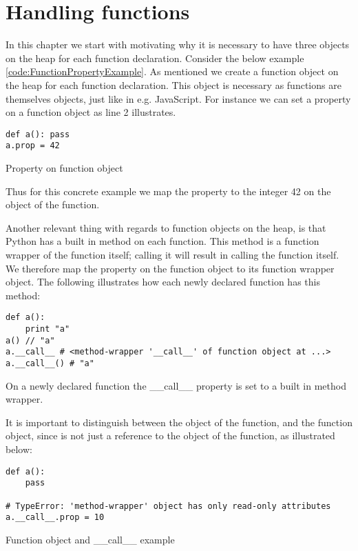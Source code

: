 \chapter{Handling functions}
\label{Functions}
In this chapter we start with motivating why it is necessary to have three objects on the heap for each function declaration. Consider the below example \ref{code:FunctionPropertyExample}. As mentioned we create a function object on the heap for each function declaration. This object is necessary as functions are themselves objects, just like in e.g. JavaScript. For instance we can set a property on a function object as line 2 illustrates.

\begin{listing}[H]
	\begin{verbatim}
def a(): pass
a.prop = 42
	\end{verbatim}
\caption{Property on function object}\label{code:FunctionPropertyExample}
\end{listing}

Thus for this concrete example we map the property  to the integer 42 on the object of the function.

Another relevant thing with regards to function objects on the heap, is that Python has a built in method  on each function. This method is a function wrapper of the function itself; calling it will result in calling the function itself. We therefore map the property  on the function object to its function wrapper object. The following illustrates how each newly declared function has this method:

\begin{listing}[H]
	\begin{verbatim}
def a():
	print "a"
a() // "a"
a.__call__ # <method-wrapper '__call__' of function object at ...> 
a.__call__() # "a"
	\end{verbatim}
\caption{On a newly declared function the \_\_call\_\_ property is set to a built in method wrapper.}\label{code:printFunctionExample}
\end{listing}

It is important to distinguish between the object of the function, and the function object, since  is not just a reference to the object of the function, as illustrated below:

\begin{listing}[H]
	\begin{verbatim}
def a(): 
	pass

# TypeError: 'method-wrapper' object has only read-only attributes
a.__call__.prop = 10
	\end{verbatim}
\caption{Function object and \_\_call\_\_ example}\label{code:callPropertyExample}
\end{listing}

